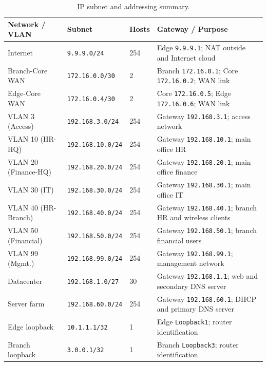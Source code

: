 \documentclass[12pt,a4paper]{article}
\newcommand{\ip}[1]{\mbox{\texttt{#1}}}
\begin{document}
\begin{table}[H]
    \centering
    \footnotesize
    \caption{IP subnet and addressing summary.}
    \label{tab:subnets}
    \setlength{\tabcolsep}{3pt}
    \begin{tabularx}{\textwidth}{@{}L{3.85cm}L{2.6cm}C{1.1cm}Y@{}}
        \hline
        \textbf{Network / VLAN} & \textbf{Subnet} & \textbf{Hosts} & \textbf{Gateway / Purpose} \\
        \hline
        Internet & \ip{9.9.9.0/24} & 254 & Edge \ip{9.9.9.1}; NAT outside and Internet cloud \\
        \hline
        Branch-Core WAN & \ip{172.16.0.0/30} & 2 & Branch \ip{172.16.0.1}; Core \ip{172.16.0.2}; WAN link \\
        \hline
        Edge-Core WAN & \ip{172.16.0.4/30} & 2 & Core \ip{172.16.0.5}; Edge \ip{172.16.0.6}; WAN link \\
        \hline
        VLAN 3 (Access) & \ip{192.168.3.0/24} & 254 & Gateway \ip{192.168.3.1}; access network \\
        \hline
        VLAN 10 (HR-HQ) & \ip{192.168.10.0/24} & 254 & Gateway \ip{192.168.10.1}; main office HR \\
        \hline
        VLAN 20 (Finance-HQ) & \ip{192.168.20.0/24} & 254 & Gateway \ip{192.168.20.1}; main office finance \\
        \hline
        VLAN 30 (IT) & \ip{192.168.30.0/24} & 254 & Gateway \ip{192.168.30.1}; main office IT \\
        \hline
        VLAN 40 (HR-Branch) & \ip{192.168.40.0/24} & 254 & Gateway \ip{192.168.40.1}; branch HR and wireless clients \\
        \hline
        VLAN 50 (Financial) & \ip{192.168.50.0/24} & 254 & Gateway \ip{192.168.50.1}; branch financial users \\
        \hline
        VLAN 99 (Mgmt.) & \ip{192.168.99.0/24} & 254 & Gateway \ip{192.168.99.1}; management network \\
        \hline
        Datacenter & \ip{192.168.1.0/27} & 30 & Gateway \ip{192.168.1.1}; web and secondary DNS server \\
        \hline
        Server farm & \ip{192.168.60.0/24} & 254 & Gateway \ip{192.168.60.1}; DHCP and primary DNS server \\
        \hline
        Edge loopback & \ip{10.1.1.1/32} & 1 & Edge \texttt{Loopback1}; router identification \\
        \hline
        Branch loopback & \ip{3.0.0.1/32} & 1 & Branch \texttt{Loopback3}; router identification \\
        \hline
    \end{tabularx}
\end{table}
\end{document}
